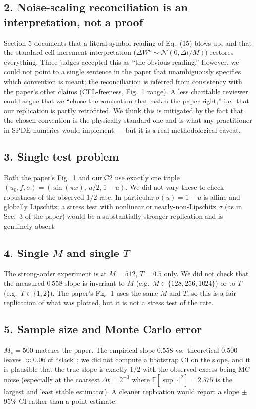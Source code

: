 \documentclass[11pt]{article}
\begin{document}
\subsection*{2. Noise-scaling reconciliation is an interpretation, not a proof}
Section 5 documents that a literal-symbol reading of Eq.\ (15) blows up, and that the
standard cell-increment interpretation ($\Delta W^n\sim \mathcal{N}(0,\Delta t/M)$) restores
everything. Three judges accepted this as ``the obvious reading.'' However, we could not point
to a single sentence in the paper that unambiguously specifies which convention is meant; the
reconciliation is inferred from consistency with the paper's other claims (CFL-freeness,
Fig.\ 1 range). A less charitable reviewer could argue that we ``chose the convention that
makes the paper right,'' i.e.\ that our replication is partly retrofitted. We think this is
mitigated by the fact that the chosen convention is the physically standard one and is what any
practitioner in SPDE numerics would implement --- but it is a real methodological caveat.

\subsection*{3. Single test problem}
Both the paper's Fig.\ 1 and our C2 use exactly one triple $(u_0,f,\sigma) =
(\sin(\pi x),\,u/2,\,1-u)$. We did not vary these to check robustness of the observed $1/2$
rate. In particular $\sigma(u)=1-u$ is affine and globally Lipschitz; a stress test with
nonlinear or nearly-non-Lipschitz $\sigma$ (as in Sec.\ 3 of the paper) would be a
substantially stronger replication and is genuinely absent.

\subsection*{4. Single $M$ and single $T$}
The strong-order experiment is at $M=512$, $T=0.5$ only. We did not check that the measured
$0.558$ slope is invariant to $M$ (e.g.\ $M\in\{128,256,1024\}$) or to $T$ (e.g.\ $T\in\{1,2\}$).
The paper's Fig.\ 1 uses the same $M$ and $T$, so this is a fair replication of what was
plotted, but it is not a stress test of the rate.

\subsection*{5. Sample size and Monte Carlo error}
$M_s=500$ matches the paper. The empirical slope $0.558$ vs.\ theoretical $0.500$ leaves
$\approx 0.06$ of ``slack''; we did not compute a bootstrap CI on the slope, and it is
plausible that the true slope is exactly $1/2$ with the observed excess being MC noise
(especially at the coarsest $\Delta t=2^{-3}$ where $\mathbb{E}[\sup|\cdot|^2]=2.575$ is the
largest and least stable estimator). A cleaner replication would report a slope $\pm$ 95\% CI
rather than a point estimate.
\end{document}
